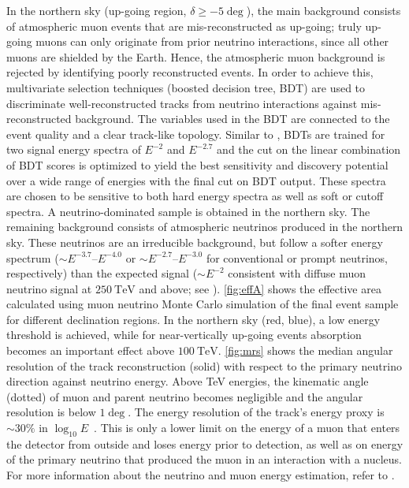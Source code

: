 \documentclass[aps,10pt,prd,twocolumn,floats,letterpaper,showpacs,nofootinbib,bibnotes,notitlepage,superscriptaddress]{revtex4-1}
\begin{document}
In the northern sky (up-going region, $\delta\geq-5\deg$), the main background
consists of atmospheric muon events that are mis-reconstructed as up-going;
truly up-going muons can only originate from prior neutrino interactions, since
all other muons are shielded by the Earth. Hence, the atmospheric muon
background is rejected by identifying poorly reconstructed events. In order to
achieve this, multivariate selection techniques (boosted decision tree, BDT)
are used to discriminate well-reconstructed tracks from neutrino interactions
against mis-reconstructed background. The variables used in the BDT are
connected to the event quality and a clear track-like topology. Similar to
\cite{Aartsen:2014cva}, BDTs are trained for two signal energy spectra of
$E^{-2}$ and $E^{-2.7}$ and the cut on the linear combination of BDT scores is
optimized to yield the best sensitivity and discovery potential over a wide
range of energies with the final cut on BDT output. These spectra are chosen to
be sensitive to both hard energy spectra as well as soft or cutoff spectra. A
neutrino-dominated sample is obtained in the northern sky. The remaining
background consists of atmospheric neutrinos produced in the northern sky.
These neutrinos are an irreducible background, but follow a softer energy
spectrum ($\sim E^{-3.7}$--$E^{-4.0}$ or $\sim E^{-2.7}$--$E^{-3.0}$ for
conventional or prompt neutrinos, respectively) than the expected signal ($\sim
E^{-2}$ consistent with diffuse muon neutrino signal at $250\:\mathrm{TeV}$ and
above; see \cite{Aartsen:2016xlq}). \ref{fig:effA} shows the effective area
calculated using muon neutrino Monte Carlo simulation of the final event sample
for different declination regions.  In the northern sky (red, blue), a low
energy threshold is achieved, while for near-vertically up-going events
absorption becomes an important effect above $100\:\mathrm{TeV}$.
\ref{fig:mrs} shows the median angular resolution of the track
reconstruction (solid) with respect to the primary neutrino direction against
neutrino energy. Above TeV energies, the kinematic angle (dotted) of muon and
parent neutrino becomes negligible and the angular resolution is below $1\deg$.
The energy resolution of the track's energy proxy is $\sim30\%$ in
$\log_{10}{E}$~\citep{Aartsen:2013vja}. This is only a lower limit on the
energy of a muon that enters the detector from outside and loses energy prior
to detection, as well as on energy of the primary neutrino that produced the
muon in an interaction with a nucleus. For more information about the neutrino
and muon energy estimation, refer to \cite{Aartsen:2015rwa, Aartsen:2016xlq}.
\end{document}
